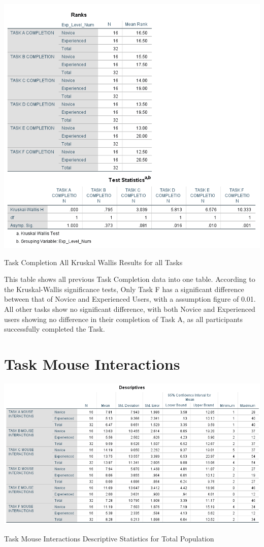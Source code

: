 \begin{table}[H]
\includegraphics[width=\linewidth]{Screenshots/UXResearchDataFiles/UXTaskCompletionData/ALLTaskKWCompletionEdited.png}
\label{DescriptiveTaskCompletionALLKW}
\caption{Task Completion All Kruskal Wallis Results for all Tasks}
\end{table}

This table shows all previous Task Completion data into one table. According to the Kruskal-Wallis significance tests, Only Task F has a significant difference between that of Novice and Experienced Users, with a assumption figure of 0.01. All other tasks show no significant difference, with both Novice and Experienced users showing no difference in their completion of Task A, as all participants successfully completed the Task.

\section{Task Mouse Interactions}

\begin{table}[H]
\includegraphics[width=\linewidth]{Screenshots/UXResearchDataFiles/UXTaskMouseInteractionsData/anovaDescriptivesTaskMouseInteractions.png}
\label{DescriptiveMouseInteractionsAllTasks}
\caption{Task Mouse Interactions Descriptive Statistics for Total Population}
\end{table}

